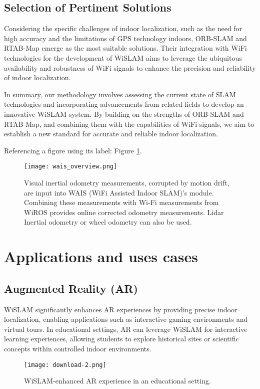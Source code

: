 \documentclass[
	a4paper, %
	11pt, %
	unnumberedsections, %
	twoside, %
]{LTJournalArticle}
\begin{document}
\subsection{Selection of Pertinent Solutions}
Considering the specific challenges of indoor localization, such as the need for high accuracy and the limitations of GPS technology indoors, ORB-SLAM and RTAB-Map emerge as the most suitable solutions. Their integration with WiFi technologies for the development of WiSLAM aims to leverage the ubiquitous availability and robustness of WiFi signals to enhance the precision and reliability of indoor localization.

In summary, our methodology involves assessing the current state of SLAM technologies and incorporating advancements from related fields to develop an innovative WiSLAM system. By building on the strengths of ORB-SLAM and RTAB-Map, and combining them with the capabilities of WiFi signals, we aim to establish a new standard for accurate and reliable indoor localization.

Referencing a figure using its label: Figure \ref{fig:tcanther}.

\begin{figure} %
	\texttt{[image: wais\_overview.png]}
	\caption{Visual inertial odometry measurements, corrupted by motion drift, are input into WAIS (WiFi Assisted Indoor SLAM)'s module. Combining these measurements with Wi-Fi measurements from WiROS provides online corrected odometry measurements. Lidar Inertial odometry or wheel odometry can also be used.}	\label{fig:tcanther}
\end{figure}

\section{Applications and uses cases}

\subsection{Augmented Reality (AR)}
WiSLAM significantly enhances AR experiences by providing precise indoor localization, enabling applications such as interactive gaming environments and virtual tours. In educational settings, AR can leverage WiSLAM for interactive learning experiences, allowing students to explore historical sites or scientific concepts within controlled indoor environments.

\begin{figure}[h]
    \centering
    \texttt{[image: download-2.png]}
    \caption{WiSLAM-enhanced AR experience in an educational setting.}
    \label{fig:download}
\end{figure}
\end{document}
